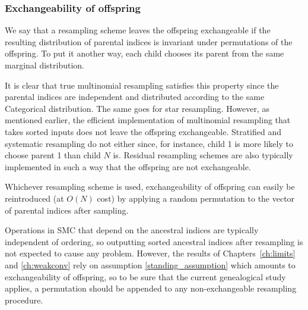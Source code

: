 %




\subsubsection{Exchangeability of offspring \seb{$\checkmark$} }
We say that a resampling scheme leaves the offspring exchangeable if the resulting distribution of parental indices is invariant under permutations of the offspring. To put it another way, each child chooses its parent from the same marginal distribution.

It is clear that true multinomial resampling satisfies this property since the parental indices are independent and distributed according to the same Categorical distribution. 
The same goes for star resampling. 
However, as mentioned earlier, the efficient implementation of multinomial resampling that takes sorted inputs does not leave the offspring exchangeable.
Stratified and systematic resampling do not either since, for instance, child 1 is more likely to choose parent 1 than child $N$ is.
Residual resampling schemes are also typically implemented in such a way that the offspring are not exchangeable.

Whichever resampling scheme is used, exchangeability of offspring can easily be reintroduced (at $O(N)$ cost) by applying a random permutation to the vector of parental indices after sampling.

Operations in SMC that depend on the ancestral indices are typically independent of ordering, so outputting sorted ancestral indices after resampling is not expected to cause any problem.
However, the results of Chapters~\ref{ch:limits} and \ref{ch:weakconv} rely on assumption \ref{standing_assumption} which amounts to exchangeability of offspring, so to be sure that the current genealogical study applies, a permutation should be appended to any non-exchangeable resampling procedure.






